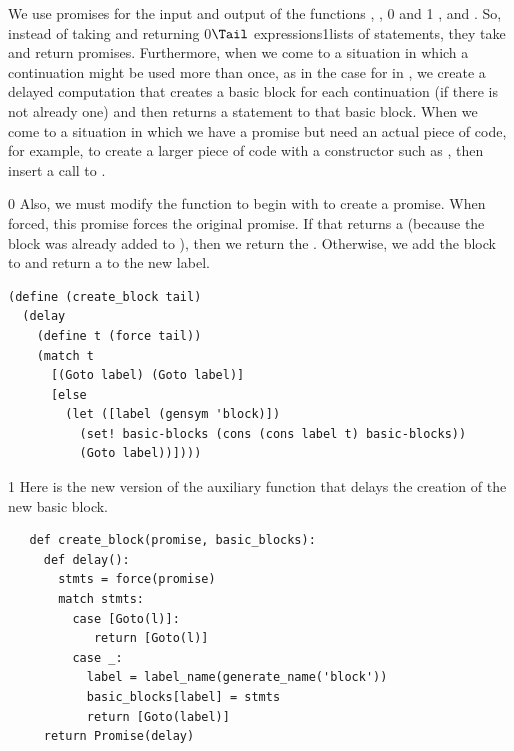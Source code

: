 \documentclass[7x10]{TimesAPriori_MIT}%
\def\racketEd{0}
\def\pythonEd{1}
\providecommand{\BookEdition}{1}
\let\edition\BookEdition
\newcommand{\racket}[1]{{\if\edition\racketEd{#1}\fi}}
\newcommand{\pythonColor}[0]{}
\newcommand{\python}[1]{{\if\edition\pythonEd\pythonColor #1\fi}}
\numberwithin{theorem}{chapter}
\numberwithin{definition}{chapter}
\numberwithin{equation}{chapter}
\begin{document}
We use promises for the input and output of the functions
, ,
%
\racket{ and }\python{ , and }.
%
So, instead of taking and returning \racket{$\Tail$
  expressions}\python{lists of statements}, they take and return
promises. Furthermore, when we come to a situation in which a
continuation might be used more than once, as in the case for
 in , we create a delayed computation
that creates a basic block for each continuation (if there is not
already one) and then returns a  statement to that basic
block. When we come to a situation in which we have a promise but need an
actual piece of code, for example, to create a larger piece of code with a
constructor such as , then insert a call to .
%
{\if\edition\racketEd
%
Also, we must modify the  function to begin with
 to create a promise. When forced, this promise forces the
original promise. If that returns a  (because the block was
already added to ), then we return the
. Otherwise, we add the block to  and
return a  to the new label.
\begin{center}
\begin{minipage}{\textwidth}
\begin{lstlisting}
(define (create_block tail)
  (delay
    (define t (force tail))
    (match t
      [(Goto label) (Goto label)]
      [else
        (let ([label (gensym 'block)])
          (set! basic-blocks (cons (cons label t) basic-blocks))
          (Goto label))])))
\end{lstlisting}
\end{minipage}
\end{center}
\fi}

{\if\edition\pythonEd\pythonColor
%
Here is the new version of the  auxiliary function
that delays the creation of the new basic block.\\
\begin{minipage}{\textwidth}
\begin{lstlisting}
   def create_block(promise, basic_blocks):
     def delay():
       stmts = force(promise)
       match stmts:
         case [Goto(l)]:
            return [Goto(l)]
         case _:
           label = label_name(generate_name('block'))
           basic_blocks[label] = stmts
           return [Goto(label)]
     return Promise(delay)
\end{lstlisting}
\end{minipage}

\fi}
\end{document}
